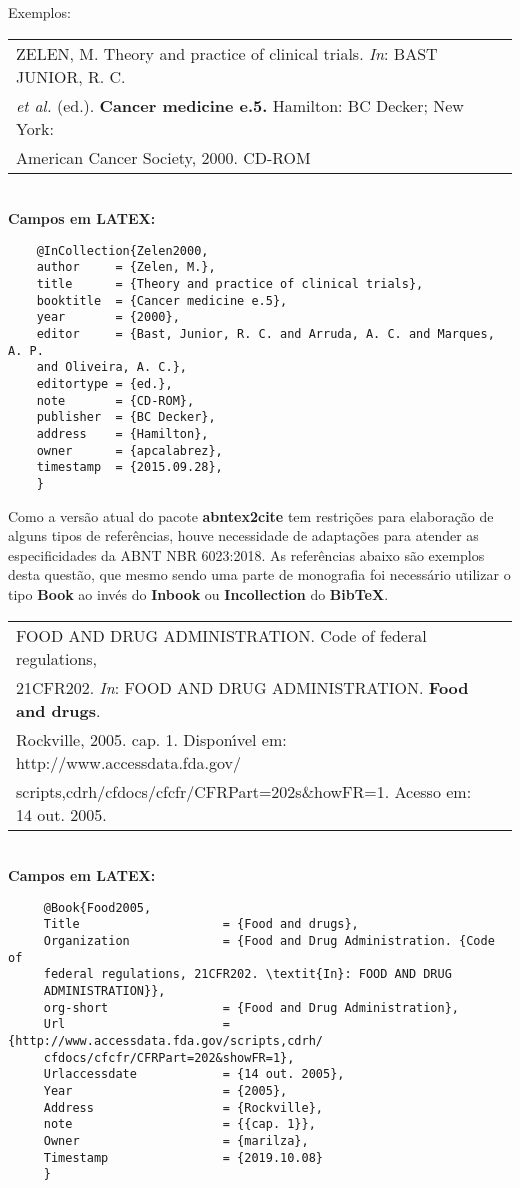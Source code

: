 	 Exemplos: \\ 
	 
	 \begin{tabular}{|l|c|} \hline
		ZELEN, M. Theory and practice of clinical trials. \textit{In}: BAST JUNIOR, R. C. \\\textit{et al.} (ed.). \textbf{Cancer medicine e.5.} Hamilton: BC Decker; New York: \\American Cancer Society, 2000. CD-ROM  \\\hline
	\end{tabular} \\ 
	
	\textbf{Campos em LATEX:} 
	
	
	\begin{verbatim}
	@InCollection{Zelen2000,
	author     = {Zelen, M.},
	title      = {Theory and practice of clinical trials},
	booktitle  = {Cancer medicine e.5},
	year       = {2000},
	editor     = {Bast, Junior, R. C. and Arruda, A. C. and Marques, A. P. 
	and Oliveira, A. C.},
	editortype = {ed.},
	note       = {CD-ROM},
	publisher  = {BC Decker},
	address    = {Hamilton},
	owner      = {apcalabrez},
	timestamp  = {2015.09.28},
	}
	\end{verbatim}
		
	 Como a vers\~ao atual do pacote \textbf{abntex2cite} tem restri\c{c}\~oes para elabora\c{c}\~ao de alguns tipos de refer\^encias, houve necessidade de adapta\c{c}\~oes para atender as especificidades da ABNT NBR 6023:2018. As  refer\^encias abaixo s\~ao exemplos desta quest\~ao, que mesmo sendo uma parte de monografia foi necess\'ario utilizar o tipo  \textbf{Book} ao inv\'es do \textbf{Inbook} ou \textbf{Incollection} do \textbf{BibTeX}. \\
	 
	 \begin{tabular}{|l|c|} \hline
	 	FOOD AND DRUG ADMINISTRATION. Code of federal regulations, \\ 21CFR202. \textit{In}: FOOD AND DRUG ADMINISTRATION. \textbf{Food and drugs}. \\Rockville, 2005. cap. 1. Dispon\'{\i}vel em: http://www.accessdata.fda.gov/\\ scripts,cdrh/cfdocs/cfcfr/CFRPart=202s\&howFR=1. Acesso em: 14 out. 2005. \\\hline
	 \end{tabular} \\ 
	 
	 \textbf{Campos em LATEX:} 
	 
	 \begin{verbatim}
	 @Book{Food2005,
	 Title                    = {Food and drugs},
	 Organization             = {Food and Drug Administration. {Code of 
	 federal regulations, 21CFR202. \textit{In}: FOOD AND DRUG 
	 ADMINISTRATION}},
	 org-short                = {Food and Drug Administration},
	 Url                      = {http://www.accessdata.fda.gov/scripts,cdrh/
	 cfdocs/cfcfr/CFRPart=202&showFR=1},
	 Urlaccessdate            = {14 out. 2005},
	 Year                     = {2005},
	 Address                  = {Rockville},
	 note                     = {{cap. 1}},
	 Owner                    = {marilza},
	 Timestamp                = {2019.10.08}
	 }
	 \end{verbatim}
	 

